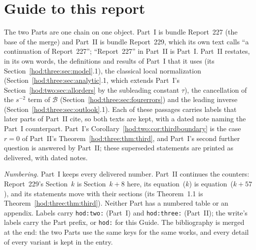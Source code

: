 \documentclass[11pt,letterpaper]{article}
\theoremstyle{definition}\newtheorem{definition}[theorem]{Definition}
\theoremstyle{remark}\newtheorem{remark}[theorem]{Remark}
\newcommand{\Bcal}{\mathcal B}
\newcommand{\file}[1]{\nolinkurl{#1}}
\begin{document}
\section*{Guide to this report}\label{hod:sec:guide}
The two Parts are one chain on one object. Part~I is bundle Report~227 (the
base of the merge) and Part~II is bundle Report~229, which its own text calls
``a continuation of Report~227''; ``Report~227'' in Part~II is Part~I. Part~II
restates, in its own words, the definitions and results of Part~I that it
uses (its Section~\ref{hod:three:sec:model}.1), the classical local
normalization (Section~\ref{hod:three:sec:analytic}.1, which extends Part~I's
Section~\ref{hod:two:sec:allorders} by the subleading constant $\tau$), the
cancellation of the $s^{-2}$ term of $\Bcal$ (Section~\ref{hod:three:sec:fourerrors})
and the leading inverse (Section~\ref{hod:three:sec:outlook}.1). Each of these
passages carries labels that later parts of Part~II cite, so both texts are
kept, with a dated note naming the Part~I counterpart. Part~I's
Corollary~\ref{hod:two:cor:thirdboundary} is the case $r=0$ of Part~II's
Theorem~\ref{hod:three:thm:third}, and Part~I's second further question is
answered by Part~II; these superseded statements are printed as delivered,
with dated notes.

\emph{Numbering.} Part~I keeps every delivered number. Part~II continues the
counters: Report~229's Section~$k$ is Section~$k+8$ here, its equation~($k$)
is equation~($k+57$), and its statements move with their sections (its
Theorem~1.1 is Theorem~\ref{hod:three:thm:third}). Neither Part has a numbered
table or an appendix. Labels carry \file{hod:two:} (Part~I) and
\file{hod:three:} (Part~II); the write's labels carry the Part prefix, or
\file{hod:} for this Guide. The bibliography is merged at the end: the two
Parts use the same keys for the same works, and every detail of every variant
is kept in the entry.
\end{document}
